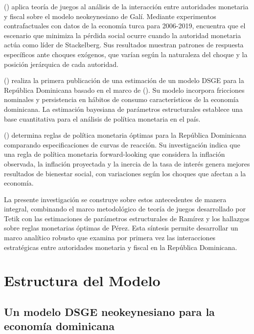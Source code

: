 \documentclass[
  man,
  longtable,
  nolmodern,
  notxfonts,
  notimes,
  colorlinks=true,linkcolor=blue,citecolor=blue,urlcolor=blue]{apa7}
\begin{document}
() aplica
teoría de juegos al análisis de la interacción entre autoridades
monetaria y fiscal sobre el modelo neokeynesiano de Galí. Mediante
experimentos contrafactuales con datos de la economía turca para
2006-2019, encuentra que el escenario que minimiza la pérdida social
ocurre cuando la autoridad monetaria actúa como líder de Stackelberg.
Sus resultados muestran patrones de respuesta específicos ante choques
exógenos, que varían según la naturaleza del choque y la posición
jerárquica de cada autoridad.

() realiza la
primera publicación de una estimación de un modelo DSGE para la
República Dominicana basado en el marco de
(). Su modelo
incorpora fricciones nominales y persistencia en hábitos de consumo
característicos de la economía dominicana. La estimación bayesiana de
parámetros estructurales establece una base cuantitativa para el
análisis de política monetaria en el país.

() determina
reglas de política monetaria óptimas para la República Dominicana
comparando especificaciones de curvas de reacción. Su investigación
indica que una regla de política monetaria forward-looking que considera
la inflación observada, la inflación proyectada y la inercia de la tasa
de interés genera mejores resultados de bienestar social, con
variaciones según los choques que afectan a la economía.

La presente investigación se construye sobre estos antecedentes de
manera integral, combinando el marco metodológico de teoría de juegos
desarrollado por Tetik con las estimaciones de parámetros estructurales
de Ramírez y los hallazgos sobre reglas monetarias óptimas de Pérez.
Esta síntesis permite desarrollar un marco analítico robusto que examina
por primera vez las interacciones estratégicas entre autoridades
monetaria y fiscal en la República Dominicana.

\section{Estructura del Modelo}\label{estructura-del-modelo}

\subsection{Un modelo DSGE neokeynesiano para la economía
dominicana}\label{un-modelo-dsge-neokeynesiano-para-la-economuxeda-dominicana}
\end{document}
